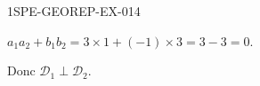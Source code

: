 \begin{corrige}{1SPE-GEOREP-EX-014}


$a_1 a_2 + b_1 b_2 = 3 \times 1 + (-1) \times 3 = 3 - 3 = 0$.

Donc $\mathcal{D}_1 \perp \mathcal{D}_2$.

\end{corrige}
